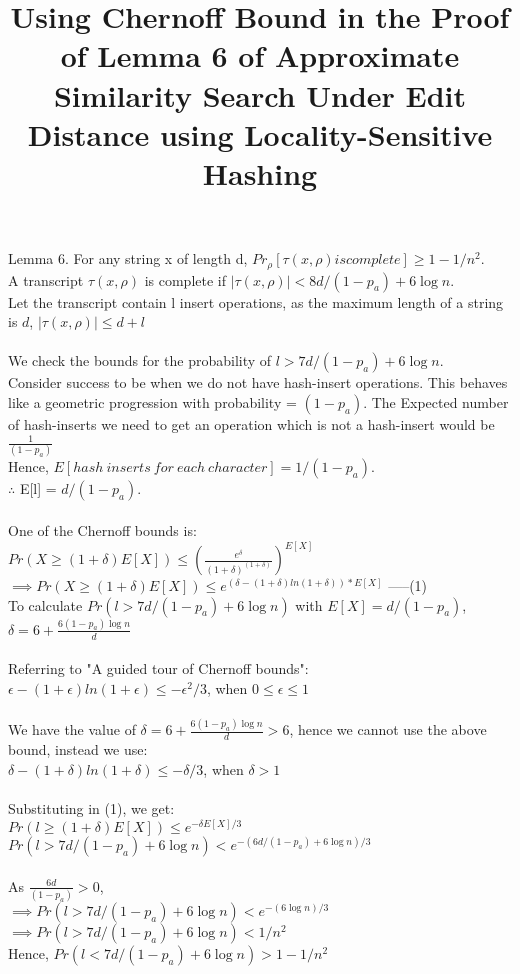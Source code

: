 \documentclass{article}
\title{Using Chernoff Bound in the Proof of Lemma 6 of Approximate Similarity Search Under Edit Distance using Locality-Sensitive Hashing}
\author{}
\date{}
\begin{document}
\maketitle
Lemma 6. For any string x of length d, 
$Pr_\rho [\tau(x,\rho) is complete] \geq 1-1/n^2$.\\

A transcript $\tau(x,\rho)$ is complete if 
$|\tau(x,\rho)| < 8d/(1-p_a)+6\log n$. \\
Let the transcript contain l insert operations, as the maximum length of a string is $d$, $|\tau(x,\rho)| \leq d+l$\\
\\
We check the bounds for the probability of $l>7d/(1-p_a)+6\log n$. \\
Consider success to be when we do not have hash-insert operations. This behaves like a geometric progression with probability = $(1-p_a)$. The Expected number of hash-inserts we need to get an operation which is not a hash-insert would be $\frac{1}{(1-p_a)}$\\
Hence, 
$E[hash\ inserts\ for\ each\ character] = 1/(1-p_a)$.\\
$\therefore$ E[l] = $d/(1-p_a)$.\\
\\
One of the Chernoff bounds is:\\
$Pr(X \geq (1+\delta)E[X]) \leq (\frac{e^\delta}{(1+\delta)^(1+\delta)})^{E[X]}$\\
$\implies Pr(X \geq (1+\delta)E[X]) \leq e^{(\delta - (1+\delta)ln(1+\delta))*E[X]}$ -----(1) \\
To calculate $Pr(l > 7d/(1-p_a) + 6\log n)$ with $E[X]=d/(1-p_a)$, $\delta = 6 + \frac{6(1-p_a)\log n}{d}$\\
\\
Referring to "A guided tour of Chernoff bounds":\\
$\epsilon - (1+\epsilon)ln(1+\epsilon) \leq -\epsilon ^2/3 $, when $0 \leq \epsilon \leq 1$ \\
\\
We have the value of $\delta = 6 + \frac{6(1-p_a)\log n}{d} > 6$, hence we cannot use the above bound, instead we use:\\
$\delta - (1+\delta)ln(1+\delta) \leq -\delta/3$, when $\delta>1$\\
\\
Substituting in (1), we get:\\
$Pr(l \geq (1+\delta)E[X]) \leq e^{-\delta E[X]/3}$\\
$Pr(l > 7d/(1-p_a) + 6\log n) < e^{-(6d/(1-p_a)+6\log n)/3}$\\
\\
As $\frac{6d}{(1-p_a)} > 0$,\\
$\implies Pr(l > 7d/(1-p_a) + 6\log n) < e^{-(6\log n)/3}$\\
$\implies Pr(l > 7d/(1-p_a) + 6\log n) < 1/n^2$\\
Hence,
$Pr(l < 7d/(1-p_a) + 6\log n) > 1-1/n^2$\\
\end{document}

